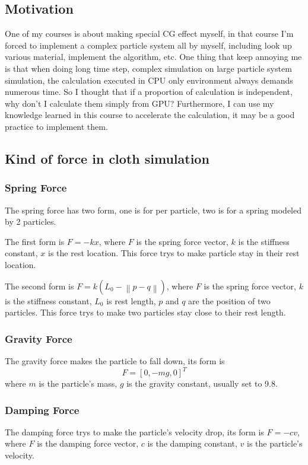 \documentclass{article}
\begin{document}
	\subsection{Motivation}
	One of my courses is about making special CG effect myself, in that course I'm forced to implement a complex particle system all by myself, including look up various material, implement the algorithm, etc. One thing that keep annoying me is that when doing long time step, complex simulation on large particle system simulation, the calculation executed in CPU only environment always demands numerous time. So I thought that if a proportion of calculation is independent, why don't I calculate them simply from GPU? Furthermore, I can use my knowledge learned in this course to accelerate the calculation, it may be a good practice to implement them.
	
	\subsection{Kind of force in cloth simulation}
	\subsubsection{Spring Force}
	The spring force has two form, one is for per particle, two is for a spring modeled by 2 particles.
	
	The first form is $F=-kx$, where $F$ is the spring force vector, $k$ is the stiffness constant, $x$ is the rest location. This force trys to make particle stay in their rest location.

	The second form is $F=k(L_0-\left\lVert p-q\right\rVert)$, where $F$ is the spring force vector, $k$ is the stiffness constant, $L_0$ is rest length, $p$ and $q$ are the position of two particles. This force trys to make two particles stay close to their rest length.

	\subsubsection{Gravity Force}
	The gravity force makes the particle to fall down, its form is 
	\begin{equation}
		F=\left [0, -mg, 0\right ]^T
	\end{equation}
	where $m$ is the particle's mass, $g$ is the gravity constant, usually set to 9.8.
	
	\subsubsection{Damping Force}
	The damping force trys to make the particle's velocity drop, its form is $F=-cv$, where $F$ is the damping force vector, $c$ is the damping constant, $v$ is the particle's velocity.
\end{document}
